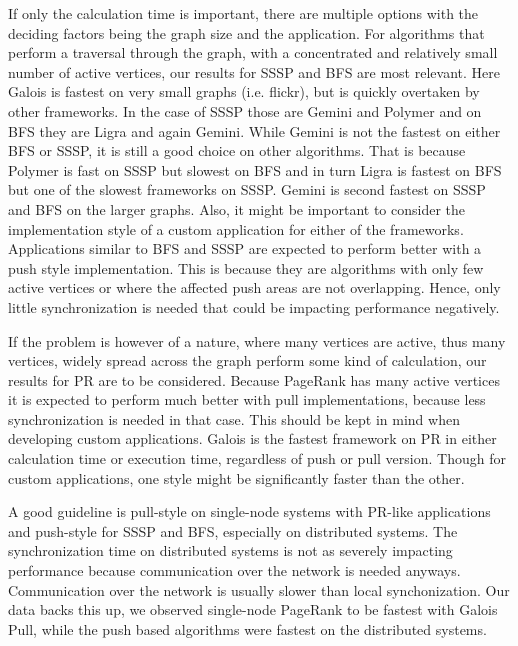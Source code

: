 If only the calculation time is important, there are multiple options with the deciding factors being the graph size and the application.
For algorithms that perform a traversal through the graph, with a concentrated and relatively small number of active vertices, our results for SSSP and BFS are most relevant.
Here Galois is fastest on very small graphs (i.e. flickr), but is quickly overtaken by other frameworks.
In the case of SSSP those are Gemini and Polymer and on BFS they are Ligra and again Gemini. While Gemini is not the fastest on either BFS or SSSP, it is still a good choice on other algorithms. That is because Polymer is fast on SSSP but slowest on BFS and in turn Ligra is fastest on BFS but one of the slowest frameworks on SSSP. Gemini is second fastest on SSSP and BFS on the larger graphs.
Also, it might be important to consider the implementation style of a custom application for either of the frameworks.
Applications similar to BFS and SSSP are expected to perform better with a push style implementation. 
This is because they are algorithms with only few active vertices or where the affected push areas are not overlapping. 
Hence, only little synchronization is needed that could be impacting performance negatively.

If the problem is however of a nature, where many vertices are active, thus many vertices, widely spread across the graph perform some kind of calculation, our results for PR are to be considered.
Because PageRank has many active vertices it is expected to perform much better with pull implementations, because less synchronization is needed in that case. This should be kept in mind when developing custom applications.
Galois is the fastest framework on PR in either calculation time or execution time, regardless of push or pull version. Though for custom applications, one style might be significantly faster than the other.

A good guideline is pull-style on single-node systems with PR-like applications and push-style for SSSP and BFS, especially on distributed systems.
The synchronization time on distributed systems is not as severely impacting performance because communication over the network is needed anyways. Communication over the network is usually slower than local synchonization.
Our data backs this up, we observed single-node PageRank to be fastest with Galois Pull, while the push based algorithms were fastest on the distributed systems.

